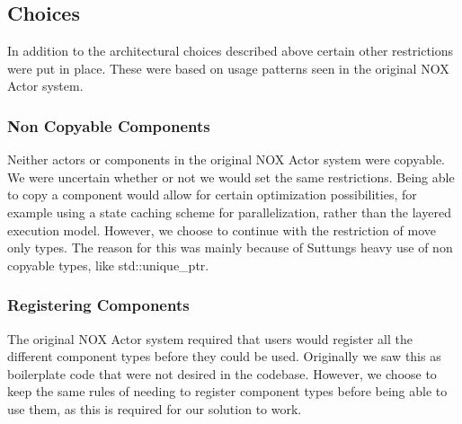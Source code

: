 \subsection{Choices}
In addition to the architectural choices described above certain other restrictions
were put in place.
These were based on usage patterns seen in the original NOX Actor system.

\subsubsection{Non Copyable Components}
Neither actors or components in the original NOX Actor system were copyable.
We were uncertain whether or not we would set the same restrictions.
Being able to copy a component would allow for certain optimization possibilities,
for example using a state caching scheme\cite[p. 930]{game_engine_architecture} for parallelization,
rather than the layered execution model.
However, we choose to continue with the restriction of move only types.
The reason for this was mainly because of Suttungs heavy use of non copyable types,
like std::unique\_ptr.

\subsubsection{Registering Components}
The original NOX Actor system required that users would register all the different component types
before they could be used.
Originally we saw this as boilerplate code that were not desired in the codebase.
However, we choose to keep the same rules of needing to register component types before being able
to use them, as this is required for our solution to work.
